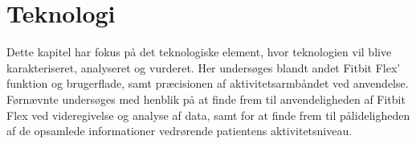 \chapter{Teknologi}
Dette kapitel har fokus på det teknologiske element, hvor teknologien vil blive karakteriseret, analyseret og vurderet. Her undersøges blandt andet Fitbit Flex' funktion og brugerflade, samt præcisionen af aktivitetsarmbåndet ved anvendelse. Førnævnte undersøges med henblik på at finde frem til anvendeligheden af Fitbit Flex ved videregivelse og analyse af data, samt for at finde frem til pålideligheden af de opsamlede informationer vedrørende patientens aktivitetsniveau.









